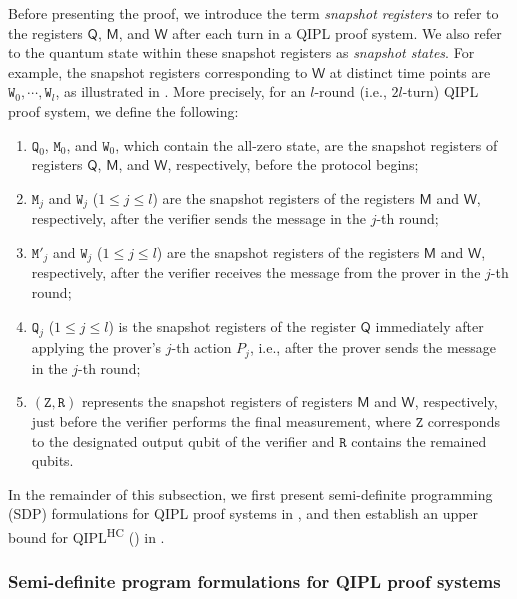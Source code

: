 \documentclass[10pt,a4paper]{article}
\numberwithin{equation}{section}
\numberwithin{figure}{section}
\newcommand{\QIPL}{\textnormal{\textsf{QIPL}}\xspace}
\newcommand{\QIPLHC}{\texorpdfstring{\textnormal{\textsf{QIPL}\textsuperscript{\textnormal{HC}}}}\xspace}
\newcommand{\sfM}{\mathsf{M}}
\newcommand{\sfQ}{\mathsf{Q}}
\newcommand{\sfW}{\mathsf{W}}
\newcommand{\ttM}{\mathtt{M}}
\newcommand{\ttQ}{\mathtt{Q}}
\newcommand{\ttR}{\mathtt{R}}
\newcommand{\ttW}{\mathtt{W}}
\newcommand{\ttZ}{\mathtt{Z}}
\begin{document}
\vspace{1em}
Before presenting the proof, we introduce the term \textit{snapshot registers} to refer to the registers $\sfQ$, $\sfM$, and $\sfW$ after each turn in a \QIPL{} proof system. We also refer to the quantum state within these snapshot registers as \textit{snapshot states}. For example, the snapshot registers corresponding to $\sfW$ at distinct time points are $\ttW_0,\cdots,\ttW_l$, as illustrated in . 
More precisely, for an $l$-round (i.e., $2l$-turn) \QIPL{} proof system, we define the following: 
\begin{enumerate}[label={\upshape(\arabic*)}, topsep=0.33em, itemsep=0.33em, parsep=0.33em]
    \item $\ttQ_0$, $\ttM_0$, and $\ttW_0$, which contain the all-zero state, are the snapshot registers of registers $\sfQ$, $\sfM$, and $\sfW$, respectively, before the protocol begins;
    \item $\ttM_j$ and $\ttW_j$ ($1 \leq j \leq l$) are the snapshot registers of the registers $\sfM$ and $\sfW$, respectively, after the verifier sends the message in the $j$-th round;
    \item $\ttM'_j$ and $\ttW_j$ ($1 \leq j \leq l$) are the snapshot registers of the registers $\sfM$ and $\sfW$, respectively, after the verifier receives the message from the prover in the $j$-th round; 
    \item $\ttQ_j$ ($1 \leq j \leq l$) is the snapshot registers of the register $\sfQ$ immediately after applying the prover's $j$-th action $P_j$, i.e., after the prover sends the message in the $j$-th round; 
    \item $(\ttZ,\ttR)$ represents the snapshot registers of registers $\sfM$ and $\sfW$, respectively, just before the verifier performs the final measurement, where $\ttZ$ corresponds to the designated output qubit of the verifier and $\ttR$ contains the remained qubits. 
\end{enumerate}

In the remainder of this subsection, we first present semi-definite programming (SDP) formulations for \QIPL{} proof systems in , and then establish an upper bound for \QIPLHC{} () in . 

\subsubsection{Semi-definite program formulations for \QIPL{} proof systems}
\label{subsubsec:SDP-formulation}
\end{document}
